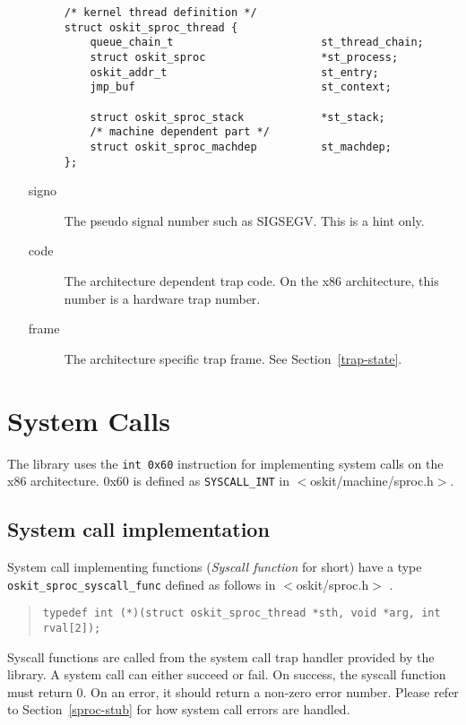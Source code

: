 \begin{itemize}
\begin{description}
\begin{verbatim}
/* kernel thread definition */
struct oskit_sproc_thread {
    queue_chain_t                       st_thread_chain;
    struct oskit_sproc                  *st_process;
    oskit_addr_t                        st_entry;
    jmp_buf                             st_context;

    struct oskit_sproc_stack            *st_stack;
    /* machine dependent part */
    struct oskit_sproc_machdep          st_machdep;
};
\end{verbatim}

        \item[signo] The pseudo signal number such as SIGSEGV.  This is
        a hint only.

        \item[code] The architecture dependent trap code.  On the x86
        architecture, this number is a hardware trap number.

        \item[frame] The architecture specific trap frame.
	See Section~\ref{trap-state}.

        \end{description}          

\end{itemize}

\section{System Calls}
The library uses the \texttt{int 0x60} instruction for implementing
system calls on the x86 architecture.  0x60 is defined as
\texttt{SYSCALL_INT} in $<$oskit/machine/sproc.h$>$.

\subsection{System call implementation}
\label{sproc-syscall}

System call implementing functions (\emph{Syscall function} for short)
have a type \texttt{oskit_sproc_syscall_func} defined as follows in
$<$oskit/sproc.h$>$ .

\begin{quote}
{\tt typedef int (*)(struct
oskit_sproc_thread *sth, void *arg, int rval[2]);}
\end{quote}

Syscall functions are called from the system call trap handler
provided by the library.  A system call can either succeed or fail.
On success, the syscall function must return 0.  On an error, it should
return a non-zero error number.  Please refer to Section~\ref{sproc-stub} for
how system call errors are handled.

